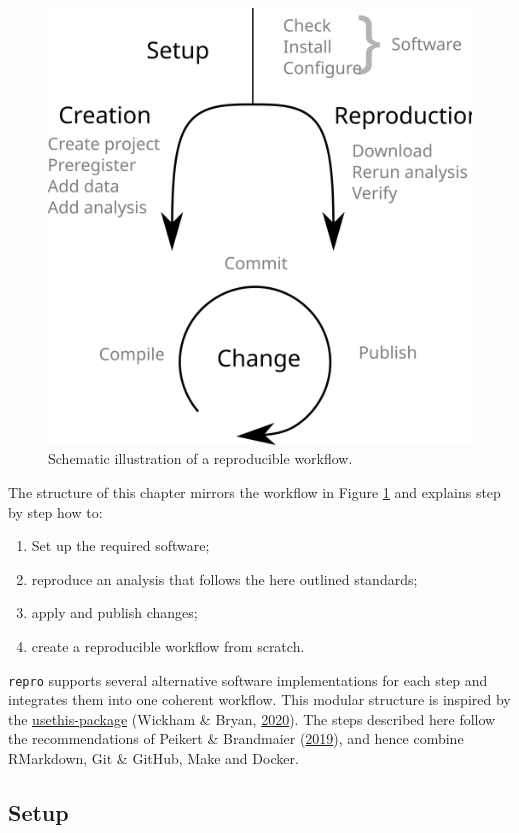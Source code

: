 \documentclass[12pt,a4paper,twoside]{article}
\providecommand{\tightlist}{%
  \setlength{\itemsep}{0pt}\setlength{\parskip}{0pt}}
\begin{document}
\begin{figure}

{\centering \includegraphics[width=0.5\linewidth]{images/idealized-workflow} 

}

\caption{Schematic illustration of a reproducible workflow.  }\label{fig:workflow}
\end{figure}

The structure of this chapter mirrors the workflow in Figure \ref{fig:workflow} and explains step by step how to:

\begin{enumerate}
\def\labelenumi{\arabic{enumi}.}
\tightlist
\item
  Set up the required software;
\item
  reproduce an analysis that follows the here outlined standards;
\item
  apply and publish changes;
\item
  create a reproducible workflow from scratch.
\end{enumerate}

\texttt{repro} supports several alternative software implementations for each step and integrates them into one coherent workflow.
This modular structure is inspired by the \href{https://usethis.r-lib.org}{usethis-package} (Wickham \& Bryan, \protect\hyperlink{ref-R-usethis}{2020}).
The steps described here follow the recommendations of Peikert \& Brandmaier (\protect\hyperlink{ref-peikertReproducibleDataAnalysis2019}{2019}), and hence combine RMarkdown, Git \& GitHub, Make and Docker.

\hypertarget{setup}{%
\subsection{Setup}\label{setup}}
\end{document}
